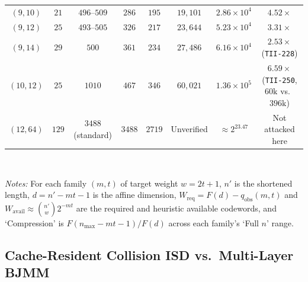 \documentclass[11pt,a4paper]{article}
\theoremstyle{definition}
\theoremstyle{remark}
\begin{document}
\begin{table}[t]
{{\begin{tabular}{@{}cccccccc@{}}
$(9, 10)$  & $21$  & $496\text{--}509$ & $286$ & $195$ & $19{,}101$ & $2.86 \times 10^4$ & $\mathbf{4.52\times}$ \\
$(9, 12)$  & $25$  & $493\text{--}505$ & $326$ & $217$ & $23{,}644$ & $5.23 \times 10^4$ & $\mathbf{3.31\times}$ \\
$(9, 14)$  & $29$  & $500$             & $361$ & $234$ & $27{,}486$ & $6.16 \times 10^4$ & $\mathbf{2.53\times}$ (\texttt{TII-228}) \\
$(10, 12)$ & $25$  & $1010$            & $467$ & $346$ & $60{,}021$ & $1.36 \times 10^5$ & $\mathbf{6.59\times}$ (\texttt{TII-250}, $60\text{k}$ vs.\ $396\text{k}$) \\
\midrule
$(12, 64)$ & $129$ & $3488$ (standard) & $3488$ & $2719$ & Unverified & $\approx 2^{23.47}$ & Not attacked here \\
\bottomrule
\end{tabular}}
\\[0.35em]
\parbox{\textwidth}{\footnotesize
\emph{Notes:} For each family $(m, t)$ of target weight $w = 2t + 1$, $n'$ is the shortened length, $d = n' - mt - 1$ is the affine dimension, $W_{\text{req}} = F(d) - q_{\mathrm{obs}}(m, t)$ and $W_{\text{avail}} \approx \binom{n'}{w} 2^{-mt}$ are the required and heuristic available codewords, and `Compression' is $F(n_{\max} - mt - 1) / F(d)$ across each family's `Full $n$' range.}}
\end{table}

\subsection{Cache-Resident Collision ISD vs.\ Multi-Layer BJMM}
\label{subsec:cache-isd}
\end{document}
